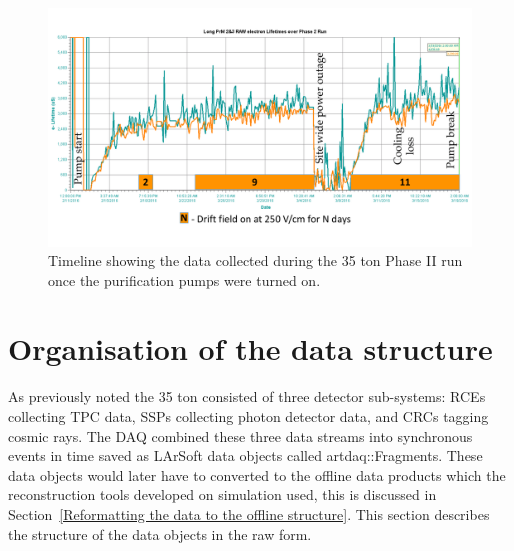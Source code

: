 \begin{figure}[h!]
  \centering
  \includegraphics[width=1.0\textwidth]{DataCollected}
  \caption[The 35 ton data sample]{Timeline showing the data collected during the 35 ton Phase II run once the purification pumps were turned on.}
  \label{fig:DataCollected}  
\end{figure}

\section{Organisation of the data structure} \label{Organisation of the data structure} %
As previously noted the 35 ton consisted of three detector sub-systems: RCEs collecting TPC data, SSPs collecting photon detector data, and CRCs tagging cosmic rays. The DAQ combined these three data streams into synchronous events in time saved as LArSoft data objects called artdaq::Fragments. These data objects would later have to converted to the offline data products which the reconstruction tools developed on simulation used, this is discussed in Section~\ref{Reformatting the data to the offline structure}. This section describes the structure of the data objects in the raw form.\\

